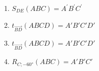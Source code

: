 \begin{exercise}
\begin{enumerate}
          \newpage
    \item $S_{DE}\left( ABC \right) = A^{'}B^{'}C^{'}$
          \begin{center}
            
          \end{center}
    \item $t_{\overrightarrow{BD}}\left( ABCD \right) = A'B'C'D'$
          \begin{center}
            
          \end{center}
    \item $t_{\overrightarrow{BD}}\left( ABCD \right) = A'B'C'D'$
          \begin{center}
            
          \end{center}
          \newpage
    \item $R_{C; \ang{-60}}\left( ABC \right) = A'B'C'$
          \begin{center}
            
          \end{center}
  \end{enumerate}
\end{exercise}

